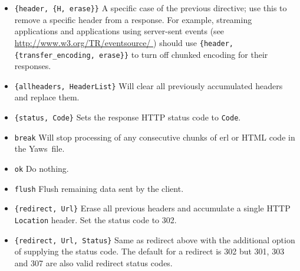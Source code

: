 \documentclass[11pt,oneside,english]{book}
\newcommand{\Yaws}            %
        {{\sc Yaws}}
\begin{document}
\begin{itemize}
\begin{itemize}
      force a \textit{Content-Length:} header (and we actually do know the
      length of the content, we can force \Yaws\ to not ship the page chunked.
    \item \verb+{transfer_encoding, What}+ - Sets the
      \textit{Transfer-Encoding:} header.
    \item \verb+{www_authenticate, What}+ - Sets the \textit{WWW-Authenticate:}
      header.
    \item \verb+{vary, What}+ - Sets the \textit{Vary:} header.
    \item \verb+{accept_ranges, What}+ - Sets the \textit{Accept-Ranges:} header.
  \end{itemize}

  All other headers must be added using the normal HTTP syntax. Example:
\begin{verbatim}
{header, {"My-X-Header", "gadong"}} or {header, "My-X-Header: gadong"}
\end{verbatim}

\item \verb+{header, {H, erase}}+ A specific case of the previous
  directive; use this to remove a specific header from a response. For
  example, streaming applications and applications using server-sent events
  (see \url{http://www.w3.org/TR/eventsource/ }) should use
  \verb+{header, {transfer_encoding, erase}}+ to turn off chunked encoding
  for their responses.

\item \verb+{allheaders, HeaderList}+ Will clear all previously
  accumulated headers and replace them.

\item \verb+{status, Code}+ Sets the response HTTP status code to
  \verb+Code+.

\item \verb+break+ Will stop processing of any consecutive chunks of
  erl or HTML code in the \Yaws\ file.

\item \verb+ok+ Do nothing.

\item \verb+flush+ Flush remaining data sent by the client.

\item \verb+{redirect, Url}+ Erase all previous headers and accumulate
  a single HTTP \verb+Location+ header. Set the status code to 302.

\item \verb+{redirect, Url, Status}+ Same as redirect above with the
  additional option of supplying the status code. The default for a
  redirect is 302 but 301, 303 and 307 are also valid redirect status
  codes.


\end{itemize}
\end{document}
